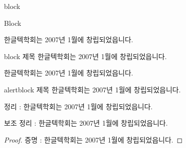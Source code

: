 \documentclass[9pt,blue,xcolor=pdftex,dvipsnames,table,handout,notes]{beamer}
\begin{document}
		\begin{frame}[t,squeeze]{block}

			\begin{block} {Block}
			\end{block}

			\begin{block} {}
			한글텍학회는 2007년 1월에 창립되었읍니다.	
			\end{block}







			\begin{block} {block 제목}
			한글텍학회는 2007년 1월에 창립되었읍니다.	
			\end{block}

			\begin{example}
			한글텍학회는 2007년 1월에 창립되었읍니다.	
			\end{example}

			\begin{alertblock} {alertblock 제목}
			한글텍학회는 2007년 1월에 창립되었읍니다.	
			\end{alertblock}



			\begin{theorem}
			정리 : 한글텍학회는 2007년 1월에 창립되었읍니다.	
			\end{theorem}


			\begin{lemma}
			보조 정리 :  한글텍학회는 2007년 1월에 창립되었읍니다.	
			\end{lemma}




			\begin{proof}
			증명 : 한글텍학회는 2007년 1월에 창립되었읍니다.	
			\end{proof}




\end{frame}
\end{document}
